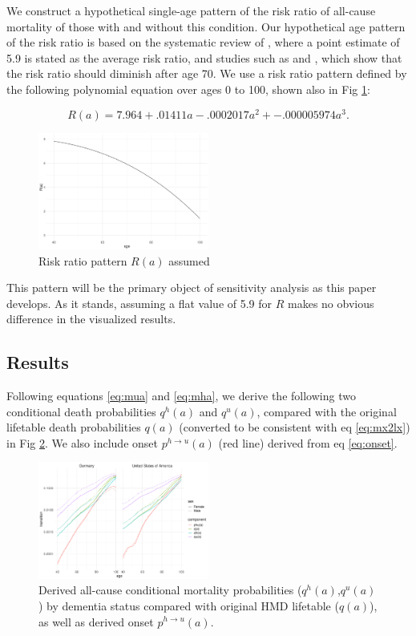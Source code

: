 \documentclass[sn-apa]{sn-jnl}%
\theoremstyle{thmstyleone}%
\theoremstyle{thmstyletwo}%
\theoremstyle{thmstylethree}%
\begin{document}
We construct a hypothetical single-age pattern of the risk ratio of all-cause mortality of those with and without this condition. Our hypothetical age pattern of the risk ratio is based on the systematic review of \citet{liang2021mortality}, where a point estimate of 5.9 is stated as the average risk ratio, and studies such as \citet{james2014contribution} and \citet{garre2019survival}, which show that the risk ratio should diminish after age 70. We use a risk ratio pattern defined by the following polynomial equation over ages 0 to 100, shown also in Fig \ref{fig:Ra}:

\begin{equation}
R(a) = 7.964 + .01411  a -.0002017  a ^ 2 + -.000005974  a^3 \mathrm{.}
\end{equation}

\begin{figure}[ht!]
\centering
\caption{Risk ratio pattern $R(a)$ assumed}
\label{fig:Ra}
\includegraphics[width=0.5\textwidth]{fig2.pdf}
\end{figure}

This pattern will be the primary object of sensitivity analysis as this paper develops. As it stands, assuming a flat value of 5.9 for $R$ makes no obvious difference in the visualized results. 

\subsection{Results}\label{results}
Following equations \eqref{eq:mua} and \eqref{eq:mha}, we derive the following two conditional death probabilities $q^h(a)$ and $q^u(a)$, compared with the original lifetable death probabilities $q(a)$ (converted to be consistent with eq \eqref{eq:mx2lx}) in Fig \ref{fig:derived_rates}. We also include onset $p^{h\rightarrow u}(a)$ (red line) derived from eq \eqref{eq:onset}.

\begin{figure}[ht!]
\centering
\caption{Derived all-cause conditional mortality probabilities ($q^h(a)$,$q^u(a)$) by dementia status compared with original HMD lifetable ($q(a)$), as well as derived onset $p^{h \rightarrow u}(a)$.}
\label{fig:derived_rates}
\includegraphics[width=0.5\textwidth]{fig3.pdf}
\end{figure}
\end{document}
